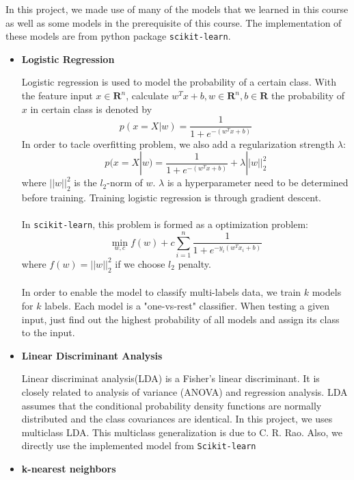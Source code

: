 \documentclass[11.5pt]{article}
\begin{document}
\begin{enumerate}
        In this project, we made use of many of the models that we learned in this course as well as some models in the prerequisite of this course. The implementation of these models are from python package \texttt{scikit-learn}\cite{scikit-learn}. 
            \begin{itemize}
                \item \textbf{Logistic Regression}
                
                Logistic regression is used to model the probability of a certain class. With the feature input $x \in \mathbf{R}^n$, calculate $w^Tx + b, w \in \mathbf{R}^n, b \in \mathbf{R}$ the probability of $x$ in certain class is denoted by 
                $$p(x = X | w) = \frac{1}{1 + e^{-(w^Tx + b)}}$$
                In order to tacle overfitting problem, we also add a regularization strength $\lambda$:
                $$p(x = X | w) = \frac{1}{1 + e^{-(w^Tx + b)}} + \lambda ||w||^2_2$$
                where $||w||_2^2$ is the $l_2$-norm of $w$. $\lambda$ is a hyperparameter need to be determined before training. Training logistic regression is through gradient descent. \\ \\
                In \texttt{scikit-learn}\cite{scikit-learn}, this problem is formed as a optimization problem: 
                $$\min_{w, c} f(w) + c\sum_{i=1}^{n}\frac{1}{1 + e^{-y_i(w^Tx_i + b)}} $$ 
                where $f(w) = ||w||^2_2$ if we choose $l_2$ penalty.\\ \\
                In order to enable the model to classify multi-labels data, we train $k$ models for $k$ labels. Each model is a "one-vs-rest" classifier. When testing a given input, just find out the highest probability of all models and assign its class to the input.
                \item \textbf{Linear Discriminant Analysis}
                
                Linear discriminat analysis(LDA) is a Fisher's linear discriminant\cite{fisherDA}. It is closely related to analysis of variance (ANOVA) and regression analysis. LDA assumes that the conditional probability density functions are normally distributed and the class covariances are identical.           In this project, we uses multiclass LDA. This multiclass generalization is due to C. R. Rao\cite{multiLDA}. Also, we directly use the implemented model from \texttt{Scikit-learn}\cite{scikit-learn}

                \item \textbf{k-nearest neighbors}
                

\end{itemize}
\end{enumerate}
\end{document}
